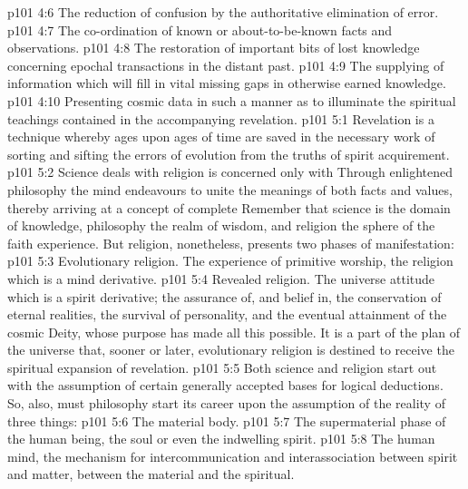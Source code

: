 \vs p101 4:6 \bibnobreakspace The reduction of confusion by the authoritative elimination of error.
\vs p101 4:7 \bibnobreakspace The co\hyp{}ordination of known or about\hyp{}to\hyp{}be\hyp{}known facts and observations.
\vs p101 4:8 \bibnobreakspace The restoration of important bits of lost knowledge concerning epochal transactions in the distant past.
\vs p101 4:9 \bibnobreakspace The supplying of information which will fill in vital missing gaps in otherwise earned knowledge.
\vs p101 4:10 \bibnobreakspace Presenting cosmic data in such a manner as to illuminate the spiritual teachings contained in the accompanying revelation.
\vs p101 5:1 Revelation is a technique whereby ages upon ages of time are saved in the necessary work of sorting and sifting the errors of evolution from the truths of spirit acquirement.
\vs p101 5:2 Science deals with  religion is concerned only with  Through enlightened philosophy the mind endeavours to unite the meanings of both facts and values, thereby arriving at a concept of complete  Remember that science is the domain of knowledge, philosophy the realm of wisdom, and religion the sphere of the faith experience. But religion, nonetheless, presents two phases of manifestation:
\vs p101 5:3 \bibnobreakspace Evolutionary religion. The experience of primitive worship, the religion which is a mind derivative.
\vs p101 5:4 \bibnobreakspace Revealed religion. The universe attitude which is a spirit derivative; the assurance of, and belief in, the conservation of eternal realities, the survival of personality, and the eventual attainment of the cosmic Deity, whose purpose has made all this possible. It is a part of the plan of the universe that, sooner or later, evolutionary religion is destined to receive the spiritual expansion of revelation.
\vs p101 5:5 \pc Both science and religion start out with the assumption of certain generally accepted bases for logical deductions. So, also, must philosophy start its career upon the assumption of the reality of three things:
\vs p101 5:6 \bibnobreakspace The material body.
\vs p101 5:7 \bibnobreakspace The supermaterial phase of the human being, the soul or even the indwelling spirit.
\vs p101 5:8 \bibnobreakspace The human mind, the mechanism for intercommunication and interassociation between spirit and matter, between the material and the spiritual.
